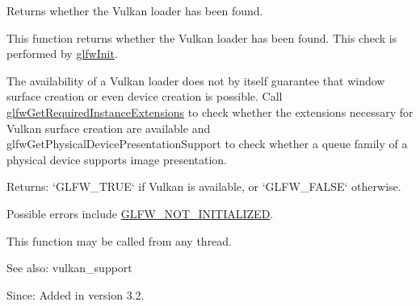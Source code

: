 Returns whether the Vulkan loader has been found. 

This function returns whether the Vulkan loader has been found. This check is performed by \hyperlink{group__init_gb41771f0215a2e0afb4cf1cf98082d40}{glfwInit}.

The availability of a Vulkan loader does not by itself guarantee that window surface creation or even device creation is possible. Call \hyperlink{group__vulkan_g70adaf0cfc99adc484c49ea99e17c2cf}{glfwGetRequiredInstanceExtensions} to check whether the extensions necessary for Vulkan surface creation are available and glfwGetPhysicalDevicePresentationSupport to check whether a queue family of a physical device supports image presentation.

\begin{Desc}
\item[Returns:]`GLFW\_\-TRUE` if Vulkan is available, or `GLFW\_\-FALSE` otherwise.\end{Desc}
Possible errors include \hyperlink{group__errors_g2374ee02c177f12e1fa76ff3ed15e14a}{GLFW\_\-NOT\_\-INITIALIZED}.

This function may be called from any thread.

\begin{Desc}
\item[See also:]vulkan\_\-support\end{Desc}
\begin{Desc}
\item[Since:]Added in version 3.2. \end{Desc}

